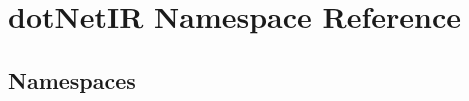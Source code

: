 \hypertarget{namespacedot_net_i_r}{}\section{dot\+Net\+IR Namespace Reference}
\label{namespacedot_net_i_r}
\subsection*{Namespaces}
\begin{DoxyCompactItemize}
\end{DoxyCompactItemize}
